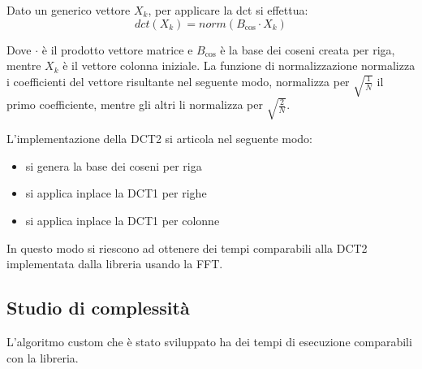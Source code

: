 Dato un generico vettore $X_k$, per applicare la dct si effettua:
\begin{equation*}
    dct(X_k) = norm(B_{\cos}\cdot X_k )
\end{equation*}

Dove $\cdot$ è il prodotto vettore matrice e $B_{\cos}$ è la base dei coseni creata
per riga, mentre $X_k$ è il vettore colonna iniziale. La funzione di normalizzazione
normalizza i coefficienti del vettore risultante nel seguente modo, normalizza
per $\sqrt{\frac{1}{N}}$ il primo coefficiente, mentre gli altri li normalizza
per $\sqrt{\frac{2}{N}}$.

L'implementazione della DCT2 si articola nel seguente modo:
\begin{itemize}
    \item si genera la base dei coseni per riga
    \item si applica inplace la DCT1 per righe
    \item si applica inplace la DCT1 per colonne
\end{itemize}

In questo modo si riescono ad ottenere dei tempi comparabili alla DCT2 implementata
dalla libreria usando la FFT.

\subsection{Studio di complessità}
L'algoritmo custom che è stato sviluppato ha dei tempi di esecuzione comparabili
con la libreria.

